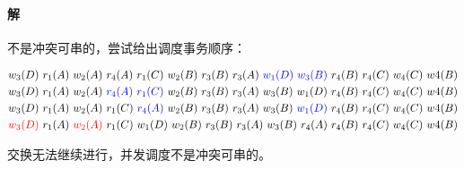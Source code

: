 \documentclass{article}
\newcommand{\tikzmark}[3][]
  {\tikz[remember picture, baseline, every node/.style={inner sep=0,outer sep=0}]
    \node [anchor = base, #1](#2) {#3};}
\begin{document}
\paragraph{解}
不是冲突可串的，尝试给出调度事务顺序：
\begin{large}
    \begin{align*}
        w_3(D)\ r_1(A)\ w_2(A)\ r_4(A)\ r_1(C)\ w_2(B)\ r_3(B)\ r_3(A)\ \tikzmark[blue]{Anchor2-a}{$w_1(D)$}\ \tikzmark[blue]{Anchor2-b}{$w_3(B)$}\ r_4(B)\ r_4(C)\ w_4(C)\ w4(B) \\
        w_3(D)\ r_1(A)\ w_2(A)\ \tikzmark[blue]{Anchor3-a}{$r_4(A)$}\ \tikzmark[blue]{Anchor3-b}{$r_1(C)$}\ w_2(B)\ r_3(B)\ r_3(A)\ w_3(B)\ w_1(D)\ r_4(B)\ r_4(C)\ w_4(C)\ w4(B) \\
        w_3(D)\ r_1(A)\ w_2(A)\ r_1(C)\ \tikzmark[blue]{Anchor4-a}{$r_4(A)$}\ w_2(B)\ r_3(B)\ r_3(A)\ w_3(B)\ \tikzmark[blue]{Anchor4-b}{$w_1(D)$}\ r_4(B)\ r_4(C)\ w_4(C)\ w4(B) \\
        \tikzmark[red]{Anchor5-a}{$w_3(D)$}\ r_1(A)\ \tikzmark[red]{Anchor5-b}{$w_2(A)$}\ r_1(C)\ w_1(D)\ w_2(B)\ r_3(B)\ r_3(A)\ w_3(B)\ r_4(A)\ r_4(B)\ r_4(C)\ w_4(C)\ w4(B) %
    \end{align*}
\end{large}
交换无法继续进行，并发调度不是冲突可串的。
\end{document}
